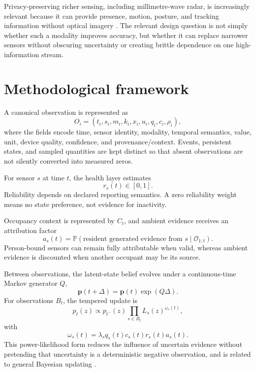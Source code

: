 \documentclass[11pt]{article}
\newcommand{\Prob}{\mathbb{P}}
\newcommand{\calO}{\mathcal{O}}
\begin{document}
Privacy-preserving richer sensing, including millimetre-wave radar, is increasingly relevant because it can provide presence, motion, posture, and tracking information without optical imagery \citep{chen2026mmwave,samimi2026fmcw}. The relevant design question is not simply whether such a modality improves accuracy, but whether it can replace narrower sensors without obscuring uncertainty or creating brittle dependence on one high-information stream.

\section{Methodological framework}
\label{sec:method}

A canonical observation is represented as
\begin{equation}
O_i=(t_i,s_i,m_i,k_i,x_i,u_i,q_i,c_i,\rho_i),
\end{equation}
where the fields encode time, sensor identity, modality, temporal semantics, value, unit, device quality, confidence, and provenance/context. Events, persistent states, and sampled quantities are kept distinct so that absent observations are not silently converted into measured zeros.

For sensor $s$ at time $t$, the health layer estimates
\begin{equation}
r_s(t)\in[0,1].
\end{equation}
Reliability depends on declared reporting semantics. A zero reliability weight means no state preference, not evidence for inactivity.

Occupancy context is represented by $C_t$, and ambient evidence receives an attribution factor
\begin{equation}
a_s(t)=\Prob(\text{resident generated evidence from }s\mid\calO_{1:t}).
\end{equation}
Person-bound sensors can remain fully attributable when valid, whereas ambient evidence is discounted when another occupant may be its source.

Between observations, the latent-state belief evolves under a continuous-time Markov generator $Q$,
\begin{equation}
\boldsymbol p(t+\Delta)=\boldsymbol p(t)\exp(Q\Delta).
\end{equation}
For observations $B_t$, the tempered update is
\begin{equation}
p_t(z)\propto p_{t^-}(z)\prod_{s\in B_t}L_s(z)^{\omega_s(t)},
\end{equation}
with
\begin{equation}
\omega_s(t)=\lambda_s q_s(t)c_s(t)r_s(t)a_s(t).
\end{equation}
This power-likelihood form reduces the influence of uncertain evidence without pretending that uncertainty is a deterministic negative observation, and is related to general Bayesian updating \citep{bissiri2016general}.
\end{document}
